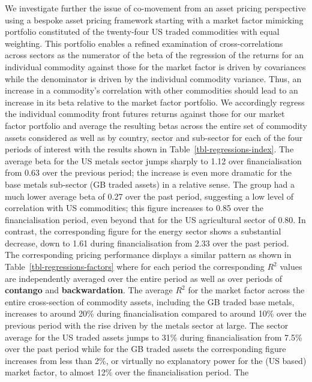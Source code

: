 \documentclass[
  authoryear,
  preprint,
  3p]{elsarticle}
\begin{document}
We investigate further the issue of co-movement from an asset pricing
perspective using a bespoke asset pricing framework starting with a
market factor mimicking portfolio constituted of the twenty-four US
traded commodities with equal weighting. This portfolio enables a
refined examination of cross-correlations across sectors as the
numerator of the beta of the regression of the returns for an individual
commodity against those for the market factor is driven by covariances
while the denominator is driven by the individual commodity variance.
Thus, an increase in a commodity's correlation with other commodities
should lead to an increase in its beta relative to the market factor
portfolio. We accordingly regress the individual commodity front futures
returns against those for our market factor portfolio and average the
resulting betas across the entire set of commodity assets considered as
well as by country, sector and sub-sector for each of the four periods
of interest with the results shown in Table~\ref{tbl-regressions-index}.
The average beta for the US metals sector jumps sharply to 1.12 over
financialisation from 0.63 over the previous period; the increase is
even more dramatic for the base metals sub-sector (GB traded assets) in
a relative sense. The group had a much lower average beta of 0.27 over
the past period, suggesting a low level of correlation with US
commodities; this figure increases to 0.85 over the financialisation
period, even beyond that for the US agricultural sector of 0.80. In
contrast, the corresponding figure for the energy sector shows a
substantial decrease, down to 1.61 during financialisation from 2.33
over the past period.\\
The corresponding pricing performance displays a similar pattern as
shown in Table~\ref{tbl-regressions-factors} where for each period the
corresponding \(R^{2}\) values are independently averaged over the
entire period as well as over periods of \textbf{contango} and
\textbf{backwardation}. The average \(R^{2}\) for the market factor
across the entire cross-section of commodity assets, including the GB
traded base metals, increases to around 20\% during financialisation
compared to around 10\% over the previous period with the rise driven by
the metals sector at large. The sector average for the US traded assets
jumps to 31\% during financialisation from 7.5\% over the past period
while for the GB traded assets the corresponding figure increases from
less than 2\%, or virtually no explanatory power for the (US based)
market factor, to almost 12\% over the financialisation period. The
\end{document}

